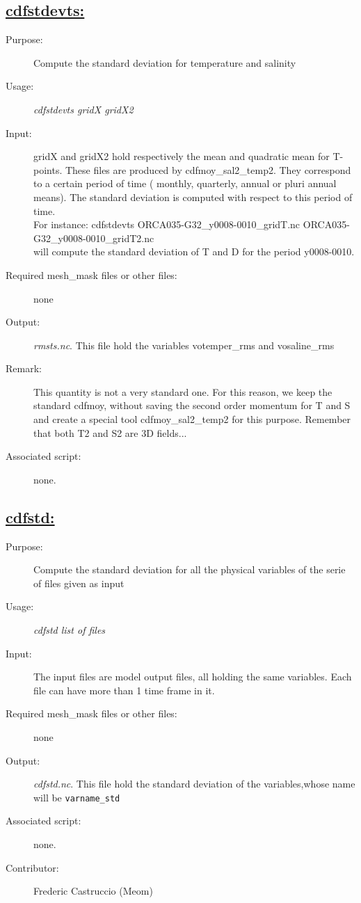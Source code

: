 \documentclass[a4paper,11pt]{article}
\begin{document}
\newpage
\subsection*{\underline{cdfstdevts:}}
\begin{description}
\item[Purpose:] Compute the standard deviation for temperature and salinity
\item[Usage:] {\em cdfstdevts gridX gridX2 }
\item[Input:] gridX and gridX2 hold respectively the mean and quadratic mean for T-points.
These files are produced by cdfmoy\_sal2\_temp2. They correspond to a certain period of time ( monthly, quarterly, annual or
pluri annual means). The standard deviation is computed with respect to this period of time. \\
For instance: cdfstdevts ORCA035-G32\_y0008-0010\_gridT.nc ORCA035-G32\_y0008-0010\_gridT2.nc \\
will compute the standard deviation of T and D  for the period y0008-0010.
\item[Required mesh\_mask files or other files:]  none
\item[Output:] {\em rmsts.nc}. This file hold the variables votemper\_rms and vosaline\_rms
\item[Remark:] This quantity is not a very standard one. For this reason, we keep the standard cdfmoy, without saving the second order
    momentum for T and S and create a special tool cdfmoy\_sal2\_temp2 for this purpose. Remember that both T2 and S2 are 3D fields... 
\item[Associated script:] none.
\end{description}

\newpage
\subsection*{\underline{cdfstd:}}
\begin{description}
\item[Purpose:] Compute the standard deviation for all the physical variables of the serie of files given as input
\item[Usage:] {\em cdfstd list of files }
\item[Input:] The input files are model output files, all holding the same variables. Each file can have more than 1 time frame in it.
\item[Required mesh\_mask files or other files:]  none
\item[Output:] {\em cdfstd.nc}. This file hold the standard deviation of the variables,whose name will be {\tt varname\_std}
\item[Associated script:] none.
\item[Contributor:] Frederic Castruccio (Meom)
\end{description}
\end{document}
